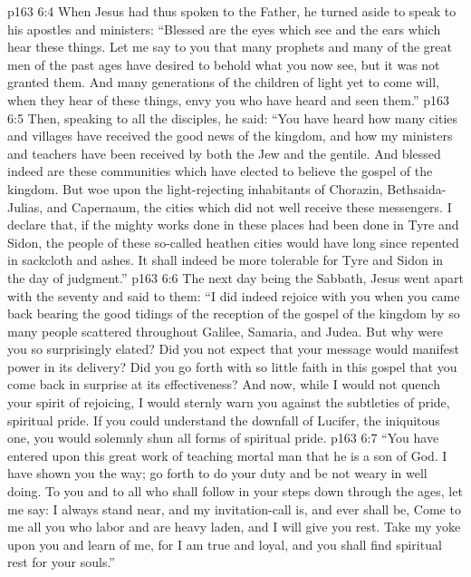 \vs p163 6:4 When Jesus had thus spoken to the Father, he turned aside to speak to his apostles and ministers: \textcolor{ubdarkred}{“Blessed are the eyes which see and the ears which hear these things. Let me say to you that many prophets and many of the great men of the past ages have desired to behold what you now see, but it was not granted them. And many generations of the children of light yet to come will, when they hear of these things, envy you who have heard and seen them.”}
\vs p163 6:5 Then, speaking to all the disciples, he said: \textcolor{ubdarkred}{“You have heard how many cities and villages have received the good news of the kingdom, and how my ministers and teachers have been received by both the Jew and the gentile. And blessed indeed are these communities which have elected to believe the gospel of the kingdom. But woe upon the light\hyp{}rejecting inhabitants of Chorazin, Bethsaida\hyp{}Julias, and Capernaum, the cities which did not well receive these messengers. I declare that, if the mighty works done in these places had been done in Tyre and Sidon, the people of these so\hyp{}called heathen cities would have long since repented in sackcloth and ashes. It shall indeed be more tolerable for Tyre and Sidon in the day of judgment.”}
\pc \vs p163 6:6 The next day being the Sabbath, Jesus went apart with the seventy and said to them: \textcolor{ubdarkred}{“I did indeed rejoice with you when you came back bearing the good tidings of the reception of the gospel of the kingdom by so many people scattered throughout Galilee, Samaria, and Judea. But why were you so surprisingly elated? Did you not expect that your message would manifest power in its delivery? Did you go forth with so little faith in this gospel that you come back in surprise at its effectiveness? And now, while I would not quench your spirit of rejoicing, I would sternly warn you against the subtleties of pride, spiritual pride. If you could understand the downfall of Lucifer, the iniquitous one, you would solemnly shun all forms of spiritual pride.}\plusone
\vs p163 6:7 \textcolor{ubdarkred}{“You have entered upon this great work of teaching mortal man that he is a son of God. I have shown you the way; go forth to do your duty and be not weary in well doing. To you and to all who shall follow in your steps down through the ages, let me say: I always stand near, and my invitation\hyp{}call is, and ever shall be, Come to me all you who labor and are heavy laden, and I will give you rest. Take my yoke upon you and learn of me, for I am true and loyal, and you shall find spiritual rest for your souls.”}
